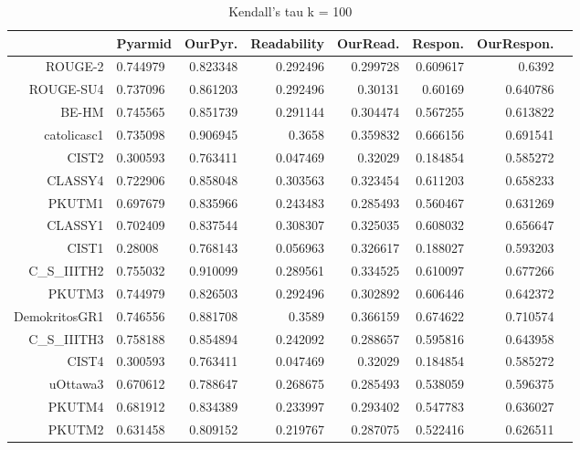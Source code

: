 \begin{table}[htbp]
\tiny
  \centering
  \caption{Kendall's tau k = 100}
    \begin{tabular}{rlrrrrrr}
    \hline
          & \multicolumn{1}{l}{Pyarmid} & \multicolumn{1}{l}{OurPyr.} & \multicolumn{1}{l}{Readability} & \multicolumn{1}{l}{OurRead.} & \multicolumn{1}{l}{Respon.} & \multicolumn{1}{l}{OurRespon.} \\
    \hline
    ROUGE-2        & 0.744979 & 0.823348 & 0.292496 & 0.299728 & 0.609617 & 0.6392 \\
    ROUGE-SU4       & 0.737096 & 0.861203 & 0.292496 & 0.30131 & 0.60169 & 0.640786 \\
    BE-HM           & 0.745565 & 0.851739 & 0.291144 & 0.304474 & 0.567255 & 0.613822 \\
    catolicasc1     & 0.735098 & 0.906945 & 0.3658 & 0.359832 & 0.666156 & 0.691541 \\
    CIST2          & 0.300593 & 0.763411 & 0.047469 & 0.32029 & 0.184854 & 0.585272 \\
    CLASSY4         & 0.722906 & 0.858048 & 0.303563 & 0.323454 & 0.611203 & 0.658233 \\
    PKUTM1 & 0.697679 & 0.835966 & 0.243483 & 0.285493 & 0.560467 & 0.631269 \\
    CLASSY1 & 0.702409 & 0.837544 & 0.308307 & 0.325035 & 0.608032 & 0.656647 \\
    CIST1 & 0.28008 & 0.768143 & 0.056963 & 0.326617 & 0.188027 & 0.593203 \\
    C\_S\_IIITH2 & 0.755032 & 0.910099 & 0.289561 & 0.334525 & 0.610097 & 0.677266 \\
    PKUTM3 & 0.744979 & 0.826503 & 0.292496 & 0.302892 & 0.606446 & 0.642372 \\
    DemokritosGR1 & 0.746556 & 0.881708 & 0.3589 & 0.366159 & 0.674622 & 0.710574 \\
    C\_S\_IIITH3 & 0.758188 & 0.854894 & 0.242092 & 0.288657 & 0.595816 & 0.643958 \\
    CIST4 & 0.300593 & 0.763411 & 0.047469 & 0.32029 & 0.184854 & 0.585272 \\
    uOttawa3 & 0.670612 & 0.788647 & 0.268675 & 0.285493 & 0.538059 & 0.596375 \\
    PKUTM4 & 0.681912 & 0.834389 & 0.233997 & 0.293402 & 0.547783 & 0.636027 \\
    PKUTM2 & 0.631458 & 0.809152 & 0.219767 & 0.287075 & 0.522416 & 0.626511 \\

\end{tabular}
\end{table}
